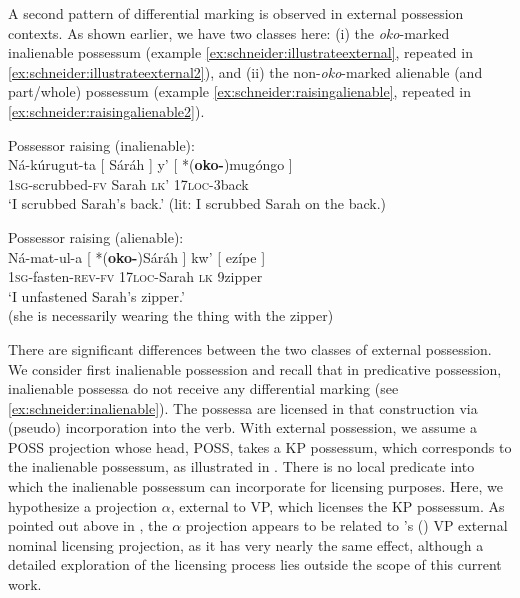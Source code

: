 \documentclass[output=paper]{langscibook}
\begin{document}
A second pattern of differential marking is observed in external possession contexts. As shown earlier, we have two classes here: (i) the \textit{oko}-marked inalienable possessum (example \ref{ex:schneider:illustrateexternal}, repeated in \ref{ex:schneider:illustrateexternal2}), and (ii) the non-\textit{oko}-marked alienable (and part/whole) possessum (example \ref{ex:schneider:raisingalienable}, repeated in \ref{ex:schneider:raisingalienable2}). 


\ea \label{ex:schneider:illustrateexternal2}
\begin{xlist}

Possessor raising (inalienable):\\
\gll Ná-kúrugut-ta [ Sáráh ] y' [ *(\textbf{oko-})mug\'ongo ] \\
\textsc{1sg}-scrubbed-\textsc{fv} {} Sarah {} \textsc{lk'} {} \textsc{17loc}-3back {} \\
\glt  `I scrubbed Sarah's back.' (lit: I scrubbed Sarah on the back.)

\end{xlist}

\ex \label{ex:schneider:raisingalienable2}
\begin{xlist}

Possessor raising (alienable):\\
\gll Ná-mat-ul-a [ *(\textbf{oko-})Sáráh ] kw' [ ezípe ]\\
\textsc{1sg}-fasten-\textsc{rev-fv} {} \textsc{17loc-}Sarah {} \textsc{lk} {} 9zipper {} \\
\glt  `I unfastened Sarah's zipper.'\\
(she is necessarily wearing the thing with the zipper)

\end{xlist}
\z

There are significant differences between the two classes of external possession. We consider first inalienable possession and recall that in predicative possession, inalienable possessa do not receive any differential marking (see \ref{ex:schneider:inalienable}). The possessa are licensed in that construction via (pseudo) incorporation into the verb. With external possession, we assume a POSS projection whose head, POSS, takes a KP possessum, which corresponds to the inalienable possessum, as illustrated in . There is no local predicate into which the inalienable possessum can incorporate for licensing purposes. Here, we hypothesize a projection $\alpha$, external to VP, which licenses the KP possessum. As pointed out above in , the $\alpha$ projection appears to be related to \citeauthor{Halpert2015}'s (\citeyear{Halpert2015}) VP external nominal licensing projection, as it has very nearly the same effect, although a detailed exploration of the licensing process lies outside the scope of this current work.
\end{document}
